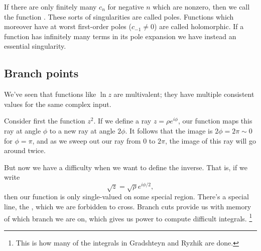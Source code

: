 If there are only finitely many $c_n$ for negative $n$ which are nonzero, then we call the function . These sorts of singularities are called poles. Functions which moreover have at worst first-order poles ($c_{-1}\neq 0$) are called holomorphic. If a function has infinitely many terms in its pole expansion we have instead an essential singularity.

\subsection*{Branch points}
We've seen that functions like $\ln z$ are multivalent; they have multiple consistent values for the same complex input.

Consider first the function $z^2$. If we define a ray $z= \rho e^{i\phi}$, our function maps this ray at angle $\phi$ to a new ray at angle $2\phi$. It follows that the image is $2\phi=2\pi\sim 0$ for $\phi=\pi$, and as we sweep out our ray from $0$ to $2\pi$, the image of this ray will go around twice.

But now we have a difficulty when we want to define the inverse. That is, if we write
\begin{equation}
    \sqrt{z} =\sqrt{\rho} e^{i\phi/2},
\end{equation}
then our function is only single-valued on some special region. There's a special line, the , which we are forbidden to cross. Branch cuts provide us with memory of which branch we are on, which gives us power to compute difficult integrals.%
    \footnote{This is how many of the integrals in Gradshteyn and Ryzhik are done.}

